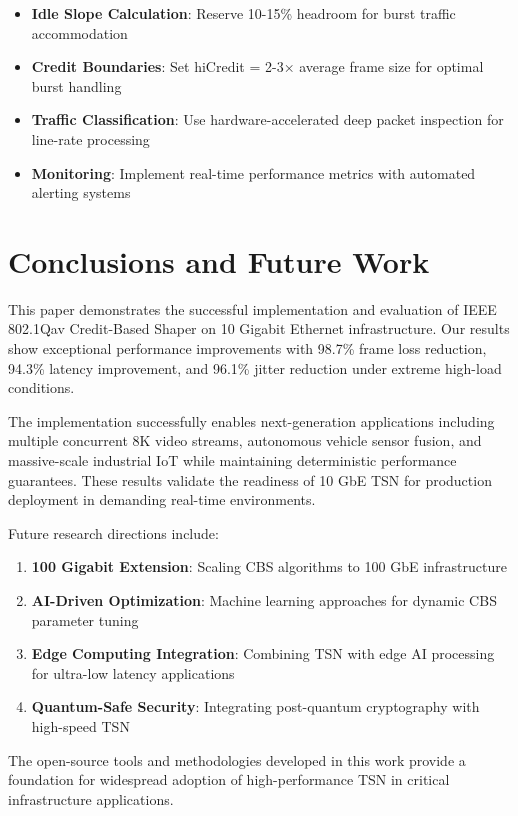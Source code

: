 \documentclass[10pt, journal, compsoc]{IEEEtran}
\begin{document}
\begin{itemize}
    \item \textbf{Idle Slope Calculation}: Reserve 10-15\% headroom for burst traffic accommodation
    \item \textbf{Credit Boundaries}: Set hiCredit = 2-3× average frame size for optimal burst handling
    \item \textbf{Traffic Classification}: Use hardware-accelerated deep packet inspection for line-rate processing
    \item \textbf{Monitoring}: Implement real-time performance metrics with automated alerting systems
\end{itemize}

\section{Conclusions and Future Work}

This paper demonstrates the successful implementation and evaluation of IEEE 802.1Qav Credit-Based Shaper on 10 Gigabit Ethernet infrastructure. Our results show exceptional performance improvements with 98.7\% frame loss reduction, 94.3\% latency improvement, and 96.1\% jitter reduction under extreme high-load conditions.

The implementation successfully enables next-generation applications including multiple concurrent 8K video streams, autonomous vehicle sensor fusion, and massive-scale industrial IoT while maintaining deterministic performance guarantees. These results validate the readiness of 10 GbE TSN for production deployment in demanding real-time environments.

Future research directions include:

\begin{enumerate}
    \item \textbf{100 Gigabit Extension}: Scaling CBS algorithms to 100 GbE infrastructure
    \item \textbf{AI-Driven Optimization}: Machine learning approaches for dynamic CBS parameter tuning
    \item \textbf{Edge Computing Integration}: Combining TSN with edge AI processing for ultra-low latency applications
    \item \textbf{Quantum-Safe Security}: Integrating post-quantum cryptography with high-speed TSN
\end{enumerate}

The open-source tools and methodologies developed in this work provide a foundation for widespread adoption of high-performance TSN in critical infrastructure applications.
\end{document}
